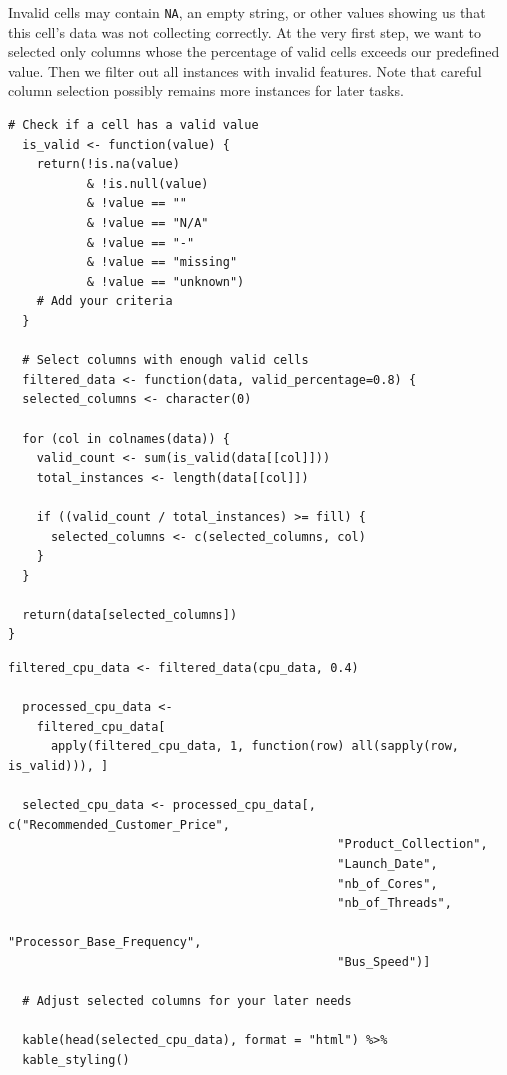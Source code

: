 Invalid cells may contain \texttt{NA}, an empty string, or other values showing us that this cell's data was not collecting correctly. At the very first step, we want to selected only columns whose the percentage of valid cells exceeds our predefined value. Then we filter out all instances with invalid features. Note that careful column selection possibly remains more instances for later tasks.

\begin{lstlisting}[caption={Cleaning functions}]
  # Check if a cell has a valid value
  is_valid <- function(value) {
    return(!is.na(value)
           & !is.null(value)
           & !value == ""
           & !value == "N/A"
           & !value == "-"
           & !value == "missing"
           & !value == "unknown")
    # Add your criteria
  }
  
  # Select columns with enough valid cells
  filtered_data <- function(data, valid_percentage=0.8) {
  selected_columns <- character(0) 
  
  for (col in colnames(data)) { 
    valid_count <- sum(is_valid(data[[col]])) 
    total_instances <- length(data[[col]]) 
    
    if ((valid_count / total_instances) >= fill) {
      selected_columns <- c(selected_columns, col)
    }
  }
  
  return(data[selected_columns])
}
  \end{lstlisting}


\begin{lstlisting}[caption={Cleaned data and selected features}]
  filtered_cpu_data <- filtered_data(cpu_data, 0.4)

  processed_cpu_data <- 
    filtered_cpu_data[
      apply(filtered_cpu_data, 1, function(row) all(sapply(row, is_valid))), ]
  
  selected_cpu_data <- processed_cpu_data[, c("Recommended_Customer_Price",
                                              "Product_Collection",
                                              "Launch_Date",
                                              "nb_of_Cores",
                                              "nb_of_Threads", 
                                              "Processor_Base_Frequency",
                                              "Bus_Speed")]
  
  # Adjust selected columns for your later needs

  kable(head(selected_cpu_data), format = "html") %>%
  kable_styling()
\end{lstlisting}

